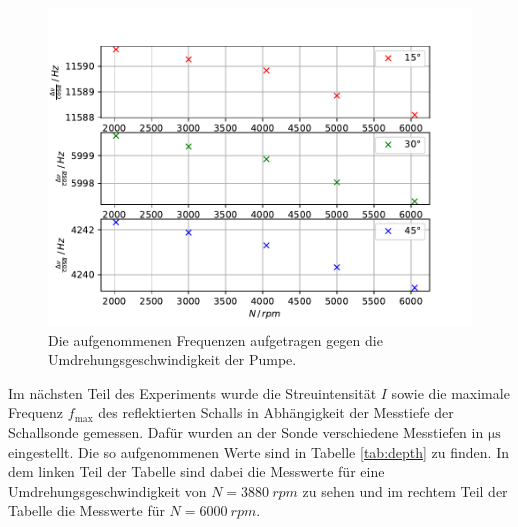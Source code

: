 \begin{figure}
    \centering
    \includegraphics[width=\textwidth]{content/data/doppler.pdf}
    \caption{Die aufgenommenen Frequenzen aufgetragen gegen die Umdrehungsgeschwindigkeit der Pumpe.}
    \label{fig:doppler}
\end{figure}

\FloatBarrier

Im nächsten Teil des Experiments wurde die Streuintensität $I$ sowie die maximale Frequenz $f_\text{max}$ des reflektierten Schalls in Abhängigkeit der Messtiefe der Schallsonde gemessen.
Dafür wurden an der Sonde verschiedene Messtiefen in $\si{\micro\second}$ eingestellt.
Die so aufgenommenen Werte sind in Tabelle \ref{tab:depth} zu finden.
In dem linken Teil der Tabelle sind dabei die Messwerte für eine Umdrehungsgeschwindigkeit von $N = \SI{3880}{rpm}$ zu sehen und im rechtem Teil der Tabelle die Messwerte für $N = \SI{6000}{rpm}$.

